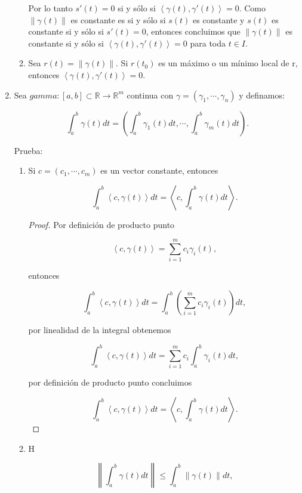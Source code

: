 \documentclass[letterpaper]{article}
\theoremstyle{definition}
\theoremstyle{lemathm}
\theoremstyle{lemathm}
\theoremstyle{lemademthm}
\newcommand{\pars}[1]{\left( #1 \right) }
\newcommand{\inprod}[1]{\left\langle #1 \right\rangle }
\newcommand{\norm}[1]{\left\lVert#1\right\rVert}
\newcommand{\R}{\mathbb{R}}
\newcommand{\1}{\mathbbm{1}}
\begin{document}
\begin{enumerate}
\begin{enumerate}
			Por lo tanto $s'(t)=0$ si y sólo si $\inprod{\gamma(t),\gamma'(t)} = 0$. Como $\norm{\gamma(t)}$ es constante es si y sólo si $s(t)$ es constante y $s(t)$ es constante si y sólo si $s'(t) = 0$, entonces concluimos que $\norm{\gamma(t)}$ es constante si y sólo si $\inprod{\gamma(t),\gamma'(t)} = 0$ para toda $t\in I$.

			\item Sea $r(t) = \norm{\gamma(t)}$. Si $r(t_0)$ es un máximo o un mínimo local de r, entonces $\inprod{\gamma(t),\gamma'(t)} = 0$.
			
			

		\end{enumerate}
        
		\item Sea $gamma : [a,b] \subset \R \to \R^m$ continua con $\gamma = (\gamma_1,\cdots,\gamma_n)$ y definamos:
		
		\[\int_{a}^{b} \gamma(t) dt = \pars{\int_{a}^{b} \gamma_1(t)dt, \cdots, \int_{a}^{b} \gamma_m(t)dt}.\]

		Prueba:

		\begin{enumerate}
			\item Si $c = \pars{c_1, \cdots, c_m}$ es un vector constante, entonces
			
			\[\int_{a}^{b} \inprod{c, \gamma(t)} dt = \inprod{c, \int_{a}^{b} \gamma(t)dt}.\] 

			\begin{proof}
				Por definición de producto punto

				\[\inprod{c, \gamma(t)} = \sum_{i=1}^{m} c_i\gamma_i(t),\]

				entonces

				\[\int_{a}^{b} \inprod{c, \gamma(t)} dt = \int_{a}^{b} \pars{\sum_{i=1}^{m} c_i\gamma_i(t)} dt,\]

				por linealidad de la integral obtenemos

				\[\int_{a}^{b} \inprod{c, \gamma(t)} dt = \sum_{i=1}^{m} c_i\int_{a}^{b} \gamma_i(t) dt,\]

				por definición de producto punto concluimos

				\[\int_{a}^{b} \inprod{c, \gamma(t)} dt = \inprod{c, \int_{a}^{b} \gamma(t)dt}.\]

			\end{proof}

			\item H
			
			\[\norm{\int_{a}^{b} \gamma(t)dt} \leq \int_{a}^{b} \norm{\gamma(t)}dt,\]


\end{enumerate}
\end{enumerate}
\end{document}
